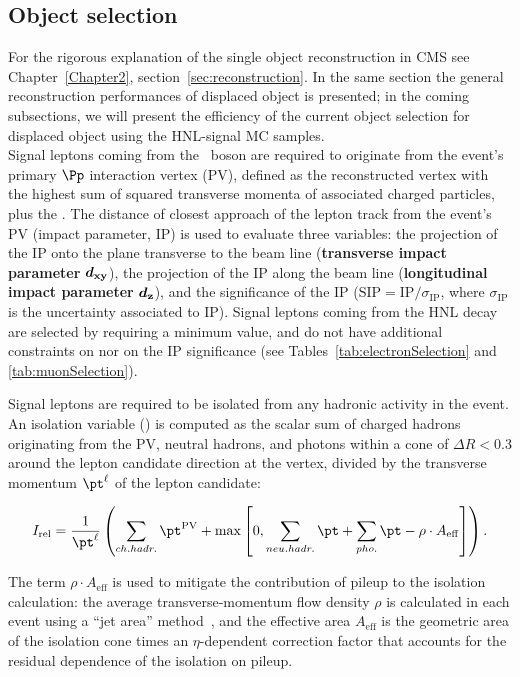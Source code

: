 \subsection{Object selection}\label{sec:object}
For the rigorous explanation of the single object reconstruction in
CMS see Chapter~\ref{Chapter2}, section~\ref{sec:reconstruction}.
In the same section the general reconstruction performances of
displaced object is presented; in the coming subsections, we will
present the efficiency of the current object selection for displaced
object using the HNL-signal MC samples. \\

Signal leptons coming from the \PW\ boson are required to originate
from the event's primary $\Pp$ interaction vertex (PV), defined as
the reconstructed vertex with the highest sum of squared transverse
momenta of associated charged particles, plus the \ptmiss.
The distance of closest approach of the lepton track from the event's
PV (impact parameter, IP) is used to evaluate three variables:
the projection of the IP onto the plane transverse to the beam line
(\textbf{transverse impact parameter} $\boldsymbol{d_{\mathrm{xy}}}$),
the projection of the IP along the beam line (\textbf{longitudinal impact
parameter} $\boldsymbol{d_{\mathrm{z}}}$),
and the significance of the IP
($\mathrm{SIP} = \mathrm{IP}/\sigma_{\mathrm{IP}}$,
where $\sigma_{\mathrm{IP}}$ is the uncertainty associated to IP). Signal leptons coming from the HNL decay are selected by requiring a
minimum \dxy value, and do not have additional constraints on \dz nor
on the IP significance (see Tables~\ref{tab:electronSelection} and
\ref{tab:muonSelection}).

Signal leptons are required to be isolated from any hadronic activity
in the event.
An isolation variable (\Irel) is computed as the scalar 
\pt sum of charged hadrons originating from the PV, neutral hadrons,
and photons within a cone of $\Delta R<0.3$ around the lepton
candidate direction at the vertex,
divided by the transverse momentum $\pt^\ell$ of the lepton candidate:
\begin{linenomath}
  \begin{equation}
    \label{eq:irel}
    \Irel = \frac{1}{\pt^\ell}
    \left(\sum_{ch.hadr.}\pt^{\mathrm{PV}} +
    \max{\left[0, \sum_{neu.hadr.}\pt + \sum_{pho.}\pt
        - \rho\cdot A_{\mathrm{eff}}\right]}\right).
  \end{equation}
\end{linenomath}
The term $\rho\cdot A_{\mathrm{eff}}$ is used to mitigate the
contribution of pileup to the isolation calculation: the average
transverse-momentum flow density $\rho$ is calculated in each event
using a ``jet area'' method~\cite{CACCIARI2008119}, and the effective
area $A_{\mathrm{eff}}$ is the geometric area of the isolation cone
times an $\eta$-dependent correction factor that accounts for the
residual dependence of the isolation on pileup.

